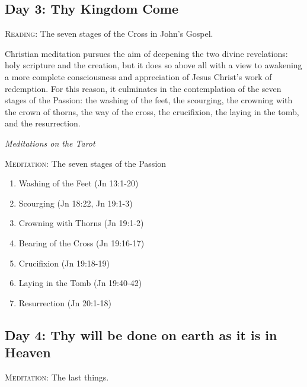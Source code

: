 \subsection*{Day 3: Thy Kingdom Come}
\textsc{Reading:} The seven stages of the Cross in John's Gospel.

\begin{quotationx}
Christian meditation pursues the aim of deepening the two divine revelations: holy scripture and the creation, but it
does so above all with a view to awakening a more complete consciousness and appreciation of Jesus
Christ's work of redemption. For this reason, it culminates in the contemplation of the seven
stages of the Passion: the washing of the feet, the scourging, the crowning with the crown of thorns, the way of the
cross, the crucifixion, the laying in the tomb, and the resurrection. 

\begin{flushright}\textit{Meditations on the Tarot}\end{flushright}

\end{quotationx}
\textsc{Meditation}: The seven stages of the Passion

\begin{enumerate}
\item Washing of the Feet (Jn 13:1-20) 
\item Scourging (Jn 18:22, Jn 19:1-3) 
\item Crowning with Thorns (Jn 19:1-2) 
\item Bearing of the Cross (Jn 19:16-17) 
\item Crucifixion (Jn 19:18-19) 
\item Laying in the Tomb (Jn 19:40-42) 
\item Resurrection (Jn 20:1-18) 
\end{enumerate}

\subsection*{Day 4: Thy will be done on earth as it is in Heaven}
\textsc{Meditation}: The last things.

